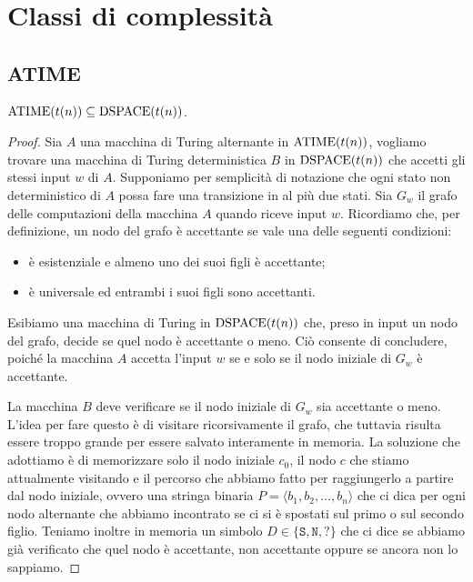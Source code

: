 \chapter{Classi di complessità}

\section{ATIME}

\begin{teorema}
  \label{thm:atime-dspace}
  $\operatorname{ATIME}(t(n)) \subseteq \operatorname{DSPACE}(t(n))$.
\end{teorema}

\begin{proof}
 Sia $A$ una macchina di Turing alternante in $\operatorname{ATIME}(t(n))$, vogliamo trovare
 una macchina di Turing deterministica $B$ in $\operatorname{DSPACE}(t(n))$ che accetti gli
 stessi input $w$ di $A$. Supponiamo per semplicità di notazione che ogni stato
 non deterministico di $A$ possa fare una transizione in al più due stati.
 Sia $G_w$ il grafo delle computazioni della macchina $A$ quando riceve input $w$.
 Ricordiamo che, per definizione, un nodo del grafo è accettante se vale una delle
 seguenti condizioni: 
 \begin{itemize}
  \item è esistenziale e almeno uno dei suoi figli è accettante;
  \item è universale ed entrambi i suoi figli sono accettanti.
 \end{itemize}
 Esibiamo una macchina di Turing in $\operatorname{DSPACE}(t(n))$ che, preso in input un nodo
 del grafo, decide se quel nodo è accettante o meno. Ciò consente di concludere, poiché
 la macchina $A$ accetta l'input $w$ se e solo se il nodo iniziale
 di $G_w$ è accettante.
 
 La macchina $B$ deve verificare se il nodo iniziale di $G_w$ sia accettante o
 meno. L'idea per fare questo è di visitare ricorsivamente il grafo, che tuttavia
 risulta essere troppo grande per essere salvato interamente in memoria. La soluzione che adottiamo
 è di memorizzare solo il nodo iniziale $c_0$, il nodo $c$ che stiamo attualmente
 visitando e il percorso che abbiamo fatto per raggiungerlo a partire dal nodo
 iniziale, ovvero una stringa binaria $P = \langle b_1, b_2, \ldots, b_n \rangle$
 che ci dica per ogni nodo alternante
 che abbiamo incontrato se ci si è spostati sul primo o sul secondo figlio.
 Teniamo inoltre in memoria un simbolo $D \in \{\texttt{S}, \texttt{N}, \texttt{?}\}$ che ci dice se
 abbiamo già verificato che quel nodo è accettante, non accettante oppure
 se ancora non lo sappiamo.
 

\end{proof}
